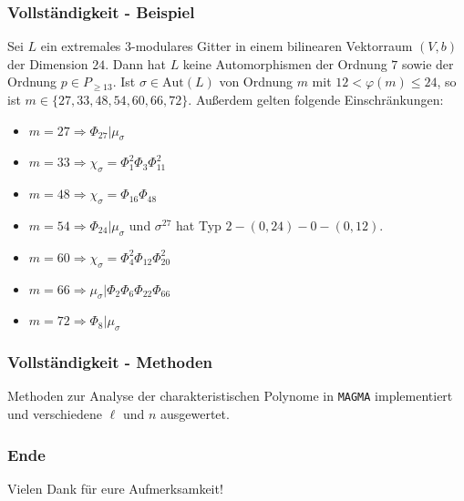 \documentclass{beamer}
\newcommand{\Aut}{\text{Aut}}
\begin{document}
\begin{frame}[plain]
	\frametitle{Vollständigkeit - Beispiel}
	\begin{Satz}
		Sei $L$ ein extremales $3$-modulares Gitter in einem bilinearen Vektorraum $(V,b)$ der Dimension $24$. Dann hat $L$ keine Automorphismen der Ordnung $7$ sowie der Ordnung $p \in P_{\ge 13}$. Ist $\sigma \in \Aut(L)$ von Ordnung $m$ mit $12 < \varphi(m) \leq 24$, so ist\linebreak
		$m \in \lbrace 27, 33, 48, 54, 60, 66, 72\rbrace$. Außerdem gelten folgende Einschränkungen:
		\begin{itemize}
			\item $m = 27 \Rightarrow \Phi_{27} \vert \mu_\sigma$
			\item $m = 33 \Rightarrow \chi_\sigma = \Phi_1^2 \Phi_3 \Phi_{11}^2$
			\item $m = 48 \Rightarrow \chi_\sigma = \Phi_{16} \Phi_{48}$
			\item $m = 54 \Rightarrow \Phi_{24} \vert \mu_\sigma$ und $\sigma^{27}$ hat Typ $2 - (0, 24) - 0 - (0, 12)$.
			\item $m = 60 \Rightarrow \chi_\sigma = \Phi_4^2 \Phi_{12} \Phi_{20}^2$
			\item $m = 66 \Rightarrow \mu_\sigma \vert \Phi_{2} \Phi_{6} \Phi_{22} \Phi_{66}$
			\item $m = 72 \Rightarrow \Phi_8 \vert \mu_\sigma$
		\end{itemize}
	\end{Satz}
\end{frame}


\begin{frame}[plain]
	\frametitle{Vollständigkeit - Methoden}
	Methoden zur Analyse der charakteristischen Polynome in \texttt{MAGMA} implementiert und verschiedene $\ell$ und $n$ ausgewertet.\\
\end{frame}

\begin{frame}[plain]
	\frametitle{Ende}
	\begin{large} \begin{center} Vielen Dank für eure Aufmerksamkeit! \end{center} \end{large}
\end{frame}
\end{document}
